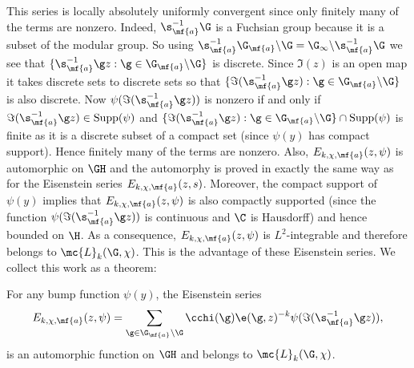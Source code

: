     This series is locally absolutely uniformly convergent since only finitely many of the terms are nonzero. Indeed, $\s_{\mf{a}}^{-1}\G$ is a Fuchsian group because it is a subset of the modular group. So using $\s_{\mf{a}}^{-1}\G_{\mf{a}}\backslash\G = \G_{\infty}\backslash\s_{\mf{a}}^{-1}\G$ we see that $\{\s_{\mf{a}}^{-1}\g z:\g \in \G_{\mf{a}}\backslash\G\}$ is discrete. Since $\Im(z)$ is an open map it takes discrete sets to discrete sets so that $\{\Im(\s_{\mf{a}}^{-1}\g z):\g \in \G_{\mf{a}}\backslash\G\}$ is also discrete. Now $\psi(\Im(\s_{\mf{a}}^{-1}\g z))$ is nonzero if and only if $\Im(\s_{\mf{a}}^{-1}\g z) \in \mathrm{Supp}(\psi)$ and $\{\Im(\s_{\mf{a}}^{-1}\g z):\g \in \G_{\mf{a}}\backslash\G\} \cap \mathrm{Supp}(\psi)$ is finite as it is a discrete subset of a compact set (since $\psi(y)$ has compact support). Hence finitely many of the terms are nonzero. Also, $E_{k,\chi,\mf{a}}(z,\psi)$ is automorphic on $\GH$ and the automorphy is proved in exactly the same way as for the Eisenstein series $E_{k,\chi,\mf{a}}(z,s)$. Moreover, the compact support of $\psi(y)$ implies that $E_{k,\chi,\mf{a}}(z,\psi)$ is also compactly supported (since the function $\psi(\Im(\s_{\mf{a}}^{-1}\g z))$ is continuous and $\C$ is Hausdorff) and hence bounded on $\H$. As a consequence, $E_{k,\chi,\mf{a}}(z,\psi)$ is $L^{2}$-integrable and therefore belongs to $\mc{L}_{k}(\G,\chi)$. This is the advantage of these Eisenstein series. We collect this work as a theorem:

    \begin{theorem}
      For any bump function $\psi(y)$, the Eisenstein series
      \[
        E_{k,\chi,\mf{a}}(z,\psi) = \sum_{\g \in \G_{\mf{a}}\backslash\G}\cchi(\g)\e(\g,z)^{-k}\psi(\Im(\s_{\mf{a}}^{-1}\g z)),
      \]
      is an automorphic function on $\GH$ and belongs to $\mc{L}_{k}(\G,\chi)$.
    \end{theorem}
    

